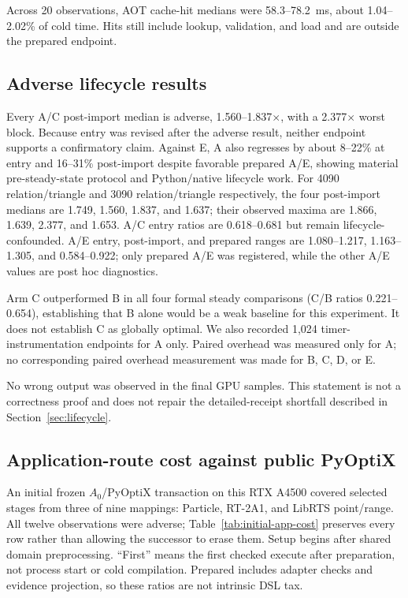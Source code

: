 \documentclass[sigplan,screen,review,anonymous]{acmart}
\begin{document}
Across 20 observations, AOT cache-hit medians were 58.3--78.2~ms, about
1.04--2.02\% of cold time. Hits still include lookup, validation, and load and
are outside the prepared endpoint.

\subsection{Adverse lifecycle results}

Every A/C post-import median is adverse, 1.560--1.837$\times$, with a
2.377$\times$ worst block. Because entry was revised after the adverse result,
neither endpoint supports a confirmatory claim. Against E, A also regresses by
about 8--22\% at entry and 16--31\% post-import despite favorable prepared A/E,
showing material pre-steady-state protocol and Python/native lifecycle work.
For 4090 relation/triangle and 3090 relation/triangle respectively, the four
post-import medians are 1.749, 1.560, 1.837, and 1.637; their observed maxima
are 1.866, 1.639, 2.377, and 1.653. A/C entry ratios are 0.618--0.681 but remain
lifecycle-confounded. A/E entry, post-import, and prepared ranges are
1.080--1.217, 1.163--1.305, and 0.584--0.922; only prepared A/E was registered,
while the other A/E values are post hoc diagnostics.

Arm C outperformed B in all four formal steady comparisons (C/B ratios
0.221--0.654), establishing that B alone would be a weak baseline for this
experiment. It does not establish C as globally optimal. We also recorded
1,024 timer-instrumentation endpoints for A only. Paired overhead was measured
only for A; no corresponding paired overhead measurement was made for B, C, D,
or E.

No wrong output was observed in the final GPU samples. This statement is not a
correctness proof and does not repair the detailed-receipt shortfall described
in Section~\ref{sec:lifecycle}.

\subsection{Application-route cost against public PyOptiX}
\label{sec:app-pyoptix}

An initial frozen $A_0$/PyOptiX transaction on this RTX A4500 covered selected
stages from three of nine mappings: Particle, RT-2A1, and LibRTS point/range.
All twelve observations were adverse; Table~\ref{tab:initial-app-cost} preserves
every row rather than allowing the successor to erase them. Setup begins after
shared domain preprocessing. ``First'' means the first checked execute after
preparation, not process start or cold compilation. Prepared includes adapter
checks and evidence projection, so these ratios are not intrinsic DSL tax.
\end{document}
